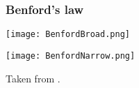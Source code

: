 \begin{frame}
   \frametitle{Benford's law}

   \texttt{[image: BenfordBroad.png]}

   \bigskip

   \texttt{[image: BenfordNarrow.png]}

   Taken from .

\end{frame}

  




